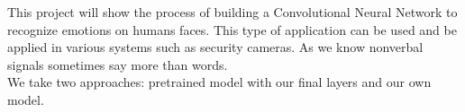 
This project will show the process of building a Convolutional Neural Network to recognize emotions on humans faces.
This type of application can be used and be applied in various systems such as security cameras.
As we know nonverbal signals sometimes say more than words.\\
We take two approaches: pretrained model with our final layers and our own model.